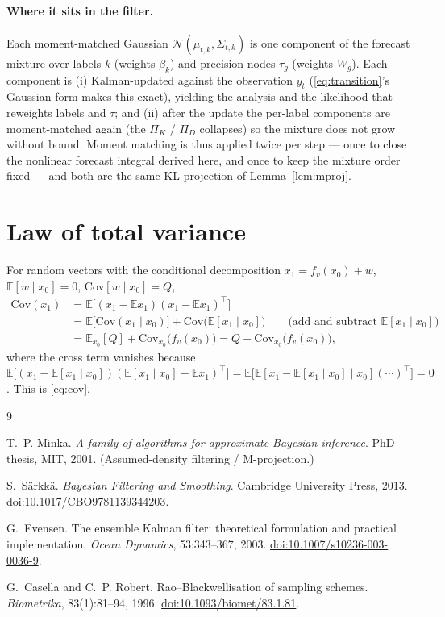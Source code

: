 \documentclass[11pt]{article}
\newcommand{\E}{\mathbb{E}}
\newcommand{\Cov}{\mathrm{Cov}}
\newcommand{\Norm}{\mathcal{N}}
\begin{document}
\paragraph{Where it sits in the filter.} Each moment-matched Gaussian
$\Norm(\mu_{t,k},\Sigma_{t,k})$ is one component of the forecast mixture over labels $k$
(weights $\beta_k$) and precision nodes $\tau_g$ (weights $W_g$). Each component is (i)
Kalman-updated against the observation $y_t$ (\eqref{eq:transition}'s Gaussian form makes
this exact), yielding the analysis and the likelihood that reweights labels and $\tau$;
and (ii) after the update the per-label components are moment-matched again (the $\Pi_K$
/ $\Pi_D$ collapses) so the mixture does not grow without bound. Moment matching is thus
applied twice per step --- once to close the nonlinear forecast integral derived here, and
once to keep the mixture order fixed --- and both are the same KL projection of
Lemma~\ref{lem:mproj}.

\appendix
\section{Law of total variance}
\label{app:ltv}

For random vectors with the conditional decomposition $x_1=f_v(x_0)+w$, $\E[w\mid x_0]=0$,
$\Cov[w\mid x_0]=Q$,
\begin{align*}
\Cov(x_1)
&=\E\big[(x_1-\E x_1)(x_1-\E x_1)^\top\big]\\
&=\E\big[\Cov(x_1\mid x_0)\big]+\Cov\big(\E[x_1\mid x_0]\big)
  \qquad\text{(add and subtract }\E[x_1\mid x_0]\text{)}\\
&=\E_{x_0}[Q]+\Cov_{x_0}\!\big(f_v(x_0)\big)=Q+\Cov_{x_0}\!\big(f_v(x_0)\big),
\end{align*}
where the cross term vanishes because
$\E\big[(x_1-\E[x_1\mid x_0])(\E[x_1\mid x_0]-\E x_1)^\top\big]
=\E\big[\E[x_1-\E[x_1\mid x_0]\mid x_0](\cdots)^\top\big]=0$. This is \eqref{eq:cov}.

\begin{thebibliography}{9}

T.~P. Minka.
\newblock \emph{A family of algorithms for approximate Bayesian inference}.
\newblock PhD thesis, MIT, 2001. (Assumed-density filtering / M-projection.)

S.~S\"arkk\"a.
\newblock \emph{Bayesian Filtering and Smoothing}.
\newblock Cambridge University Press, 2013.
\newblock \href{https://doi.org/10.1017/CBO9781139344203}{doi:10.1017/CBO9781139344203}.

G.~Evensen.
\newblock The ensemble Kalman filter: theoretical formulation and practical
implementation.
\newblock \emph{Ocean Dynamics}, 53:343--367, 2003.
\newblock \href{https://doi.org/10.1007/s10236-003-0036-9}{doi:10.1007/s10236-003-0036-9}.

G.~Casella and C.~P. Robert.
\newblock Rao--Blackwellisation of sampling schemes.
\newblock \emph{Biometrika}, 83(1):81--94, 1996.
\newblock \href{https://doi.org/10.1093/biomet/83.1.81}{doi:10.1093/biomet/83.1.81}.

\end{thebibliography}
\end{document}
